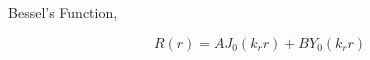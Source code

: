 Bessel's Function,

\begin{equation}
    R(r) = A J_0 (k_r r) + B Y_0(k_r r ) 
    \label{eqn:besselsfun}
\end{equation}
